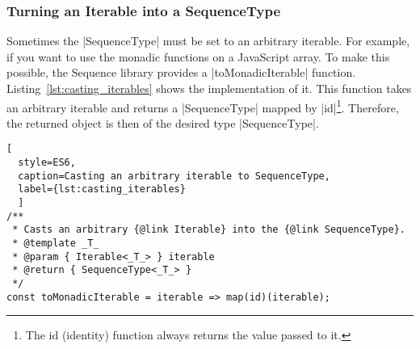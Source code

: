 \subsubsection{Turning an Iterable into a SequenceType}
\label{subsub:Turn Iterables into SequenceType}
Sometimes the |SequenceType| must be set to an arbitrary iterable. For example,
if you want to use the monadic functions on a JavaScript array. To make this
possible, the Sequence library provides a |toMonadicIterable| function.
Listing~\ref{lst:casting_iterables} shows the
implementation of it. This function takes an arbitrary iterable and returns a
|SequenceType| mapped by |id|\footnote{The id (identity) function always
returns the value passed to it.}. 
Therefore, the returned object is then of the desired type |SequenceType|.

\begin{lstlisting}[
  style=ES6, 
  caption=Casting an arbitrary iterable to SequenceType,
  label={lst:casting_iterables}
  ]
/**
 * Casts an arbitrary {@link Iterable} into the {@link SequenceType}.
 * @template _T_
 * @param { Iterable<_T_> } iterable
 * @return { SequenceType<_T_> }
 */
const toMonadicIterable = iterable => map(id)(iterable);
\end{lstlisting}
